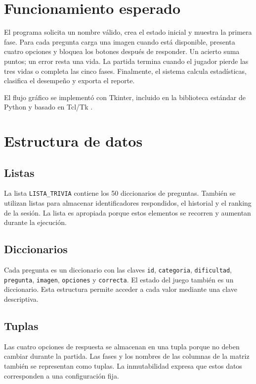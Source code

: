 \documentclass[stu,12pt,a4paper,biblatex,floatsintext]{apa7}
\begin{document}
\section{Funcionamiento esperado}

El programa solicita un nombre válido, crea el estado inicial y muestra la primera fase. Para cada pregunta carga una imagen cuando está disponible, presenta cuatro opciones y bloquea los botones después de responder. Un acierto suma puntos; un error resta una vida. La partida termina cuando el jugador pierde las tres vidas o completa las cinco fases. Finalmente, el sistema calcula estadísticas, clasifica el desempeño y exporta el reporte.

El flujo gráfico se implementó con Tkinter, incluido en la biblioteca estándar de Python y basado en Tcl/Tk \parencite{pythonTkinter2026}.

\section{Estructura de datos}

\subsection{Listas}

La lista \texttt{LISTA\_TRIVIA} contiene los 50 diccionarios de preguntas. También se utilizan listas para almacenar identificadores respondidos, el historial y el ranking de la sesión. La lista es apropiada porque estos elementos se recorren y aumentan durante la ejecución.

\subsection{Diccionarios}

Cada pregunta es un diccionario con las claves \texttt{id}, \texttt{categoria}, \texttt{dificultad}, \texttt{pregunta}, \texttt{imagen}, \texttt{opciones} y \texttt{correcta}. El estado del juego también es un diccionario. Esta estructura permite acceder a cada valor mediante una clave descriptiva.

\subsection{Tuplas}

Las cuatro opciones de respuesta se almacenan en una tupla porque no deben cambiar durante la partida. Las fases y los nombres de las columnas de la matriz también se representan como tuplas. La inmutabilidad expresa que estos datos corresponden a una configuración fija.
\end{document}
